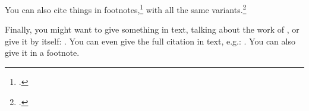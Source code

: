\documentclass[12pt]{article}
\begin{document}
You can also cite things in footnotes,\footcite{Khan1972} with all the same variants.\footcites[Also see][33]{Bonaparte1923}[42]{Victoria2012}

Finally, you might want to give something in text, talking about the work of \textcite{Khan1972}, or give it by itself: \cite{Caesar1991}. You can even give the full citation in text, e.g.: . You can also give it in a footnote.

\printbibliography
\end{document}
